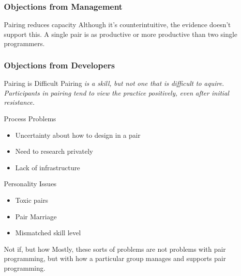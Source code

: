 \begin{frame}
  \frametitle{Objections from Management}
  \begin{block}{Pairing reduces capacity}
  Although it's counterintuitive, the evidence doesn't support this. A single pair is as productive or more productive than two single programmers.
  \end{block}
\end{frame}

\begin{frame}[allowframebreaks]
  \frametitle{Objections from Developers}
  \begin{block}{Pairing is Difficult}
  Pairing \em{is} a skill, but not one that is difficult to aquire\cite{Mendes:2005:IPN:1151954.1067526}. Participants in pairing tend to view the practice positively, even after initial resistance\cite{Begel:2008:PPW:1414004.1414026}.
  \end{block}
  \begin{block}{Process Problems}
  \begin{itemize}
  \item Uncertainty about how to design in a pair
  \item Need to research privately
  \item Lack of infrastructure
  \end{itemize}
  \end{block}
  \begin{block}{Personality Issues}
  \begin{itemize}
  \item Toxic pairs
  \item Pair Marriage
  \item Mismatched skill level
  \end{itemize}
  \end{block}
  \begin{block}{Not if, but how}
  Mostly, these sorts of problems are not problems with pair programming, but with how a particular group manages and supports pair programming.
  \end{block}
\end{frame}
